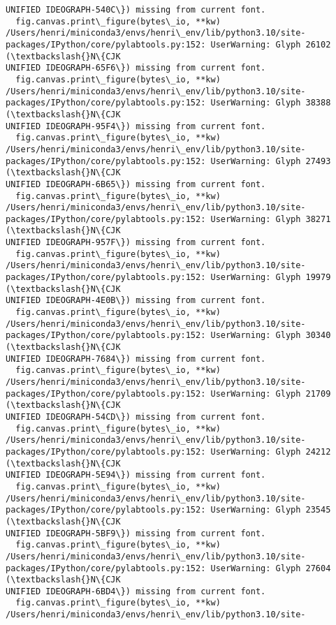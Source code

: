 \documentclass[11pt]{article}
\begin{document}
\begin{Verbatim}[commandchars=\\\{\}]
UNIFIED IDEOGRAPH-540C\}) missing from current font.
  fig.canvas.print\_figure(bytes\_io, **kw)
/Users/henri/miniconda3/envs/henri\_env/lib/python3.10/site-
packages/IPython/core/pylabtools.py:152: UserWarning: Glyph 26102 (\textbackslash{}N\{CJK
UNIFIED IDEOGRAPH-65F6\}) missing from current font.
  fig.canvas.print\_figure(bytes\_io, **kw)
/Users/henri/miniconda3/envs/henri\_env/lib/python3.10/site-
packages/IPython/core/pylabtools.py:152: UserWarning: Glyph 38388 (\textbackslash{}N\{CJK
UNIFIED IDEOGRAPH-95F4\}) missing from current font.
  fig.canvas.print\_figure(bytes\_io, **kw)
/Users/henri/miniconda3/envs/henri\_env/lib/python3.10/site-
packages/IPython/core/pylabtools.py:152: UserWarning: Glyph 27493 (\textbackslash{}N\{CJK
UNIFIED IDEOGRAPH-6B65\}) missing from current font.
  fig.canvas.print\_figure(bytes\_io, **kw)
/Users/henri/miniconda3/envs/henri\_env/lib/python3.10/site-
packages/IPython/core/pylabtools.py:152: UserWarning: Glyph 38271 (\textbackslash{}N\{CJK
UNIFIED IDEOGRAPH-957F\}) missing from current font.
  fig.canvas.print\_figure(bytes\_io, **kw)
/Users/henri/miniconda3/envs/henri\_env/lib/python3.10/site-
packages/IPython/core/pylabtools.py:152: UserWarning: Glyph 19979 (\textbackslash{}N\{CJK
UNIFIED IDEOGRAPH-4E0B\}) missing from current font.
  fig.canvas.print\_figure(bytes\_io, **kw)
/Users/henri/miniconda3/envs/henri\_env/lib/python3.10/site-
packages/IPython/core/pylabtools.py:152: UserWarning: Glyph 30340 (\textbackslash{}N\{CJK
UNIFIED IDEOGRAPH-7684\}) missing from current font.
  fig.canvas.print\_figure(bytes\_io, **kw)
/Users/henri/miniconda3/envs/henri\_env/lib/python3.10/site-
packages/IPython/core/pylabtools.py:152: UserWarning: Glyph 21709 (\textbackslash{}N\{CJK
UNIFIED IDEOGRAPH-54CD\}) missing from current font.
  fig.canvas.print\_figure(bytes\_io, **kw)
/Users/henri/miniconda3/envs/henri\_env/lib/python3.10/site-
packages/IPython/core/pylabtools.py:152: UserWarning: Glyph 24212 (\textbackslash{}N\{CJK
UNIFIED IDEOGRAPH-5E94\}) missing from current font.
  fig.canvas.print\_figure(bytes\_io, **kw)
/Users/henri/miniconda3/envs/henri\_env/lib/python3.10/site-
packages/IPython/core/pylabtools.py:152: UserWarning: Glyph 23545 (\textbackslash{}N\{CJK
UNIFIED IDEOGRAPH-5BF9\}) missing from current font.
  fig.canvas.print\_figure(bytes\_io, **kw)
/Users/henri/miniconda3/envs/henri\_env/lib/python3.10/site-
packages/IPython/core/pylabtools.py:152: UserWarning: Glyph 27604 (\textbackslash{}N\{CJK
UNIFIED IDEOGRAPH-6BD4\}) missing from current font.
  fig.canvas.print\_figure(bytes\_io, **kw)
/Users/henri/miniconda3/envs/henri\_env/lib/python3.10/site-

\end{Verbatim}
\end{document}
